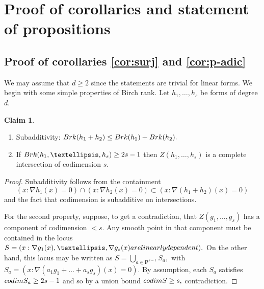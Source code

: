 \documentclass[10pt,a4paper]{amsart}
\theoremstyle{definition}
\newtheorem{claim}[theorem]{Claim}
\renewcommand{\P}{\mathbf{P}}
\newcommand{\codim}{\textnormal{codim}}
\newcommand{\brk}{\textnormal{Brk}}
\begin{document}
\section{Proof of corollaries and statement of propositions}

\subsection{Proof of corollaries \ref{cor:surj} and  \ref{cor:p-adic}}

We may assume that $d\ge 2$ since the statements are trivial for linear forms. We begin with some simple properties of Birch rank. Let $h_1,\ldots,h_s$ be forms of degree $d.$

\begin{claim}\label{brk-basic}\mbox{}
\begin{enumerate}
    \item Subadditivity:
    $\brk(h_1+h_2) \le \brk(h_1)+\brk(h_2).$
    \item If $\brk(h_1,\ldots,h_s) \ge 2s-1$ then $Z(h_1,\ldots,h_s)$ is a complete intersection of codimension $s.$
\end{enumerate}
    
\end{claim}

\begin{proof}
    Subadditivity follows from the containment 
    \[
    (x:\nabla h_1(x) = 0) \cap (x:\nabla h_2(x) = 0) \subset (x:\nabla (h_1+h_2)(x) = 0)
    \]
    and the fact that codimension is subadditive on intersections. 

    For the second property, suppose, to get a contradiction, that $Z(g_1,\ldots,g_s)$ has a component of codimension $<s.$ Any smooth point in that component must be contained in the locus $S = (x: \nabla g_1(x),\ldots,\nabla g_s(x) \textnormal{ are linearly dependent}).$ On the other hand, this locus may be written as $S = \bigcup_{a\in \P^{s-1}} S_a,$ with $ S_a =  (x: \nabla (a_1g_1+\ldots+a_sg_s)(x) = 0).$ By assumption, each $S_a$ satisfies $\codim S_a \ge 2s-1$ and so by a union bound $\codim S \ge s,$ contradiction.
\end{proof}
\end{document}
